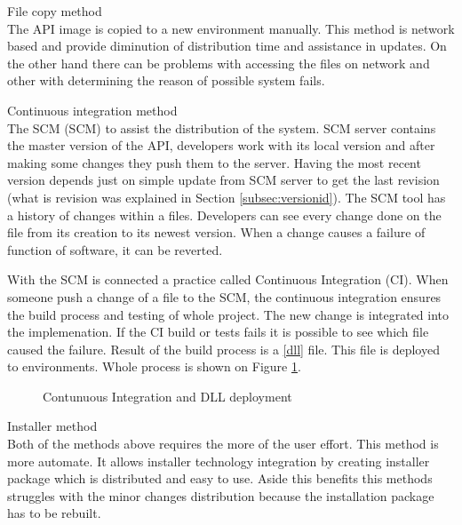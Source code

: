 \begin{description}
  \item{File copy method} \hfill \\
  The API image is copied to a new environment manually. This method is network based and provide diminution of distribution time and assistance in updates. On the other hand there can be problems with accessing the files on network and other with determining the reason of possible system fails. 
  \item{Continuous integration method} \hfill \\
  The \gls{SCM} (SCM) to assist the distribution of the system. SCM server contains the master version of the API, developers work with its local version and after making some changes they push them to the server. Having the most recent version depends just on simple update from SCM server to get the last revision (what is revision was explained in Section \ref{subsec:versionid}). The SCM tool has a history of changes within a files. Developers can see every change done on the file from its creation to its newest version. When a change causes a failure of function of software, it can be reverted.
  
  With the SCM is connected a practice called Continuous Integration (CI). When someone push a change of a file to the SCM, the continuous integration ensures the build process and testing of whole project. The new change is integrated into the implemenation. If the CI build or tests fails it is possible to see which file caused the failure. 
  Result of the build process is a \ref{dll} file. This file is deployed to environments. Whole process is shown on Figure \ref{fig:deployment-process}.
  
\begin{figure}[htp] 
\caption{Contunuous Integration and DLL deployment}
\label{fig:deployment-process}
\end{figure} 
   
  \item{Installer method} \hfill \\
  Both of the methods above requires the more of the user effort. This method is more automate. It allows installer technology integration by creating installer package which is distributed and easy to use. Aside this benefits this methods struggles with the minor changes distribution because the installation package has to be rebuilt.
\end{description}


